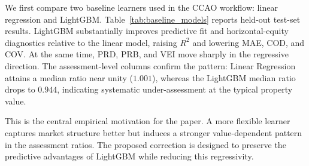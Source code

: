 \documentclass[12pt]{article}
\theoremstyle{plain}
\theoremstyle{definition}
\newcommand{\1}{\mathbf{1}}
\begin{document}
We first compare two baseline learners used in the CCAO workflow: linear regression and LightGBM. Table~\ref{tab:baseline_models} reports held-out test-set results. LightGBM substantially improves predictive fit and horizontal-equity diagnostics relative to the linear model, raising $R^2$ and lowering MAE, COD, and COV. At the same time, PRD, PRB, and VEI move sharply in the regressive direction. The assessment-level columns confirm the pattern: Linear Regression attains a median ratio near unity ($1.001$), whereas the LightGBM median ratio drops to $0.944$, indicating systematic under-assessment at the typical property value.

This is the central empirical motivation for the paper. A more flexible learner captures market structure better but induces a stronger value-dependent pattern in the assessment ratios. The proposed correction is designed to preserve the predictive advantages of LightGBM while reducing this regressivity.





\begin{table}[!ht]
\centering
\caption{Baseline comparison on the 2023 test set. Lower is better for MAE, COD, and COV. For PRD, median $r$, and mean $r$, values closer to one are preferred; for PRB and VEI, values closer to zero are preferred.}
\label{tab:baseline_models}
\end{table}

\end{document}
